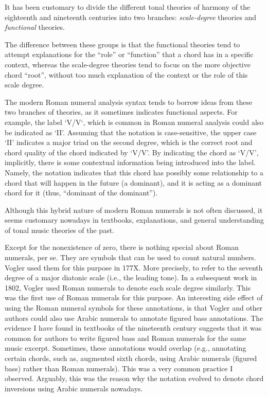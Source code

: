 It has been customary to divide the different tonal theories of harmony of the eighteenth and nineteenth centuries into two branches: \emph{scale-degree} theories and \emph{functional} theories.

The difference between these groups is that the functional theories tend to attempt explanations for the ``role'' or ``function'' that a chord has in a specific context, whereas the scale-degree theories tend to focus on the more objective chord ``root'', without too much explanation of the context or the role of this scale degree.

The modern Roman numeral analysis syntax tends to borrow ideas from these two branches of theories, as it sometimes indicates functional aspects.
For example, the label `V/V`, which is common in Roman numeral analysis could also be indicated as `II'.
Assuming that the notation is case-sensitive, the upper case `II' indicates a major triad on the second degree, which is the correct root and chord quality of the chord indicated by `V/V'.
By indicating the chord as `V/V', implicitly, there is some contextual information being introduced into the label.
Namely, the notation indicates that this chord has possibly some relationship to a chord that will happen in the future (a dominant), and it is acting as a dominant chord for it (thus, ``dominant of the dominant'').

Although this hybrid nature of modern Roman numerals is not often discussed, it seems customary nowadays in textbooks, explanations, and general understanding of tonal music theories of the past.


Except for the nonexistence of zero, there is nothing special about Roman numerals, per se.
They are symbols that can be used to count natural numbers.
Vogler used them for this purpose in 177X.
More precisely, to refer to the seventh degree of a major diatonic scale (i.e., the leading tone).
In a subsequent work in 1802, Vogler used Roman numerals to denote each scale degree similarly.
This was the first use of Roman numerals for this purpose.
An interesting side effect of using the Roman numeral symbols for these annotations, is that Vogler and other authors could also use Arabic numerals to annotate figured bass annotations.
The evidence I have found in textbooks of the nineteenth century suggests that it was common for authors to write figured bass and Roman numerals for the same music excerpt.
Sometimes, these annotations would overlap (e.g., annotating certain chords, such as, augmented sixth chords, using Arabic numerals (figured bass) rather than Roman numerals).
This was a very common practice I observed.
Arguably, this was the reason why the notation evolved to denote chord inversions using Arabic numerals nowadays.

